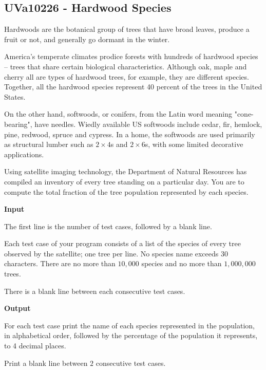 \subsection{UVa10226 - Hardwood Species}
Hardwoods are the botanical group of trees that have broad leaves, produce a fruit or not, and generally go dormant in the winter.

America's temperate climates prodice forests with hundreds of hardwood species -- trees that share certain biological characteristics. Although oak, maple and cherry all are types of hardwood trees, for example, they are different species. Together, all the hardwood species represent 40 percent of the trees in the United States.

On the other hand, softwoods, or conifers, from the Latin word meaning "cone-bearing", have needles. Wiedly available US softwoods include cedar, fir, hemlock, pine, redwood, spruce and cypress. In a home, the softwoods are used primarily as structural lumber such as $2 \times 4$s and $2 \times 6$s, with some limited decorative applications.

Using satellite imaging technology, the Department of Natural Resources has compiled an inventory of every tree standing on a particular day. You are to compute the total fraction of the tree population represented by each species.

\begin{flushleft}
{\color{red} \textbf{Input}}
\end{flushleft}
The first line is the number of test cases, followed by a blank line.

Each test case of your program consists of a list of the species of every tree observed by the satellite; one tree per line. No species name exceeds $30$ characters. There are no more than $10,000$ species and no more than $1,000,000$ trees.

There is a blank line between each consecutive test cases.

\begin{flushleft}
{\color{red} \textbf{Output}}
\end{flushleft}
For each test case print the name of each species represented in the population, in alphabetical order, followed by the percentage of the population it represents, to 4 decimal places.

Print a blank line between $2$ consecutive test cases.

